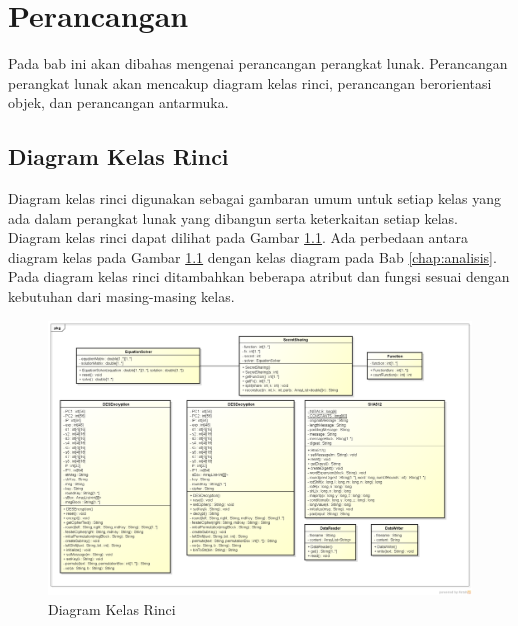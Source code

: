 \chapter{Perancangan}
\label{chap:perancangan}

Pada bab ini akan dibahas mengenai perancangan perangkat lunak. Perancangan perangkat lunak akan mencakup diagram kelas rinci, perancangan berorientasi objek, dan perancangan antarmuka.

\section{Diagram Kelas Rinci}

Diagram kelas rinci digunakan sebagai gambaran umum untuk setiap kelas yang ada dalam perangkat lunak yang dibangun serta keterkaitan setiap kelas. Diagram kelas rinci dapat dilihat pada Gambar \ref{fig:final_class_diagram}. Ada perbedaan antara diagram kelas pada Gambar \ref{fig:final_class_diagram} dengan kelas diagram pada Bab \ref{chap:analisis}. Pada diagram kelas rinci ditambahkan beberapa atribut dan fungsi sesuai dengan kebutuhan dari masing-masing kelas.


\begin{figure}[h]
	\centering
	\includegraphics[angle=90, origin=c, scale=0.5]{Gambar/final_class_diagram}
	\caption{Diagram Kelas Rinci}\label{fig:final_class_diagram}
\end{figure}


